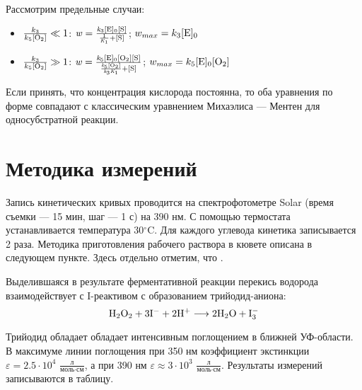 \documentclass[a4paper]{article}
\begin{document}
\par \vspace{0.2 cm}
Рассмотрим предельные случаи:
\Large
\begin{itemize}
    \item $\frac{k_3}{k_5[\rm O_2]} \ll 1$: \hspace{0.2 cm} $\it w = \frac{k_{\rm 3}[\rm E]_{\rm 0}[\rm S]}{\frac{\rm 1}{K_{\rm 1}} + [\rm S]}$; \hspace{0.2 cm} $w_{max} = k_{3}[\rm E]_{\rm 0}$

    \item $\frac{k_3}{k_5[\rm O_2]} \gg 1$: \hspace{0.2 cm} $\it w = \frac{k_{\rm 5}[\rm E]_{\rm 0}[\rm O_2][\rm S]}{\frac{k_{\rm 5}[\rm O_2]}{k_{\rm 3}K_{\rm 1}} + [\rm S]}$; \hspace{0.2 cm} $w_{max} = k_{5}[\rm E]_{\rm 0}[O_2]$
\end{itemize} \large
\par \vspace{0.2 cm}
Если принять, что концентрация кислорода постоянна, то оба уравнения по форме совпадают с классическим уравнением Михаэлиса --- Ментен для односубстратной реакции.
 

\section{\LARGE \textbf{Методика измерений}}
\par \hspace{0.33 cm}
Запись кинетических кривых проводится на спектрофотометре Solar (время съемки --- 15 мин, шаг --- 1 с) на 390 нм. С помощью термостата устанавливается температура 30$^{\circ}$C. Для каждого углевода кинетика записывается 2 раза. Методика приготовления рабочего раствора в кювете описана в следующем пункте. Здесь отдельно отметим, что \textbf{}. \par \vspace{0.2 cm}
Выделившаяся в результате ферментативной реакции перекись водорода взаимодействует с I-реактивом с образованием трийодид-аниона:
\Large
\[
\rm H_2O_2 + 3I^{-} + 2H^{+} \longrightarrow 2H_2O + I_3^{-}
\] \large
\par \vspace{0.1 cm}
Трийодид обладает обладает интенсивным поглощением в ближней УФ-области. В максимуме линии поглощения при 350 нм коэффициент экстинкции $\varepsilon = 2.5 \cdot 10^4$ $\frac{\text{л}}{\text{моль} \cdot \text{см}}$, а при 390 нм $\varepsilon \approx 3 \cdot 10^3$ $\frac{\text{л}}{\text{моль} \cdot \text{см}}$. Результаты измерений записываются в таблицу.
\end{document}
